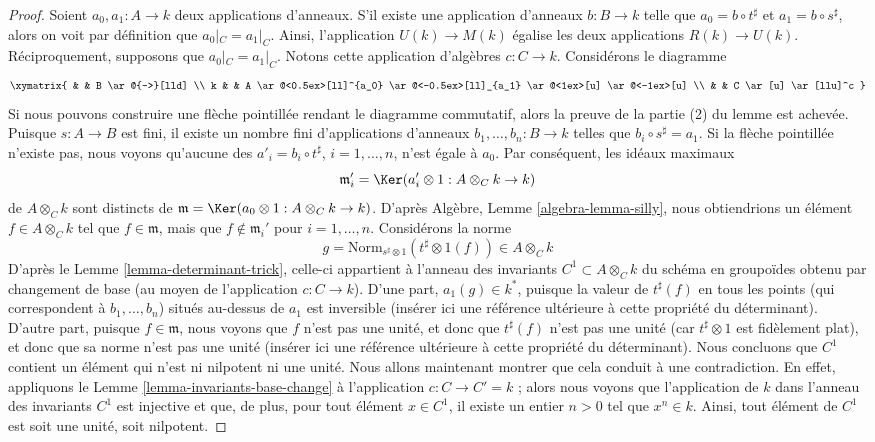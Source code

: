 \begin{proof}
\medskip\noindent
Soient $a_0, a_1 : A \to k$ deux applications d'anneaux. S'il existe une application d'anneaux
$b : B \to k$ telle que $a_0 = b \circ t^\sharp$ et $a_1 = b \circ s^\sharp$,
alors on voit par définition que $a_0|_C = a_1|_C$. Ainsi, l'application
$U(k) \to M(k)$ égalise les deux applications $R(k) \to U(k)$.
Réciproquement, supposons que $a_0|_C = a_1|_C$. Notons cette application
d'algèbres $c : C \to k$. Considérons le diagramme
$$
\xymatrix{
& &
B \ar@{-->}[lld] \\
k & &
A
\ar@<0.5ex>[ll]^{a_0}
\ar@<-0.5ex>[ll]_{a_1}
\ar@<1ex>[u]
\ar@<-1ex>[u] \\
& &
C \ar[u] \ar[llu]^c
}
$$
Si nous pouvons construire une flèche pointillée rendant le diagramme commutatif, alors
la preuve de la partie (2) du lemme est achevée. Puisque $s : A \to B$ est fini,
il existe un nombre fini d'applications d'anneaux
$b_1, \ldots, b_n : B \to k$ telles que $b_i \circ s^\sharp = a_1$.
Si la flèche pointillée n'existe pas, nous voyons qu'aucune des
$a'_i = b_i \circ t^\sharp$, $i = 1, \ldots, n$, n'est égale à $a_0$.
Par conséquent, les idéaux maximaux
$$
\mathfrak m'_i = \Ker(a_i' \otimes 1 : A \otimes_C k \to k)
$$
de $A \otimes_C k$ sont distincts de
$\mathfrak m = \Ker(a_0 \otimes 1 : A \otimes_C k \to k)$.
D'après Algèbre, Lemme \ref{algebra-lemma-silly}, nous obtiendrions un élément
$f \in A \otimes_C k$ tel que $f \in \mathfrak m$, mais que
$f \not \in \mathfrak m_i'$ pour $i = 1, \ldots, n$.
Considérons la norme
$$
g = \text{Norm}_{s^\sharp \otimes 1}(t^\sharp \otimes 1(f))
\in
A \otimes_C k
$$
D'après le Lemme \ref{lemma-determinant-trick}, celle-ci appartient à l'anneau des invariants
$C^1 \subset A \otimes_C k$ du schéma en groupoïdes obtenu par
changement de base (au moyen de l'application $c : C \to k$). D'une part,
$a_1(g) \in k^*$, puisque
la valeur de $t^\sharp(f)$ en tous les points (qui correspondent à
$b_1, \ldots, b_n$) situés au-dessus de $a_1$ est
inversible (insérer ici une référence ultérieure à cette propriété du déterminant).
D'autre part, puisque $f \in \mathfrak m$, nous voyons que
$f$ n'est pas une unité, et donc que $t^\sharp(f)$ n'est pas une unité
(car $t^\sharp \otimes 1$ est fidèlement plat),
et donc que sa norme n'est pas une unité (insérer ici une référence ultérieure
à cette propriété du déterminant). Nous concluons que $C^1$ contient
un élément qui n'est ni nilpotent
ni une unité. Nous allons maintenant montrer que cela conduit à une contradiction.
En effet, appliquons le Lemme \ref{lemma-invariants-base-change}
à l'application $c : C \to C' = k$ ; alors
nous voyons que l'application de $k$ dans l'anneau des invariants $C^1$ est injective
et que, de plus, pour tout élément $x \in C^1$, il existe un entier
$n > 0$ tel que $x^n \in k$. Ainsi, tout élément de $C^1$ est
soit une unité, soit nilpotent.


\end{proof}
